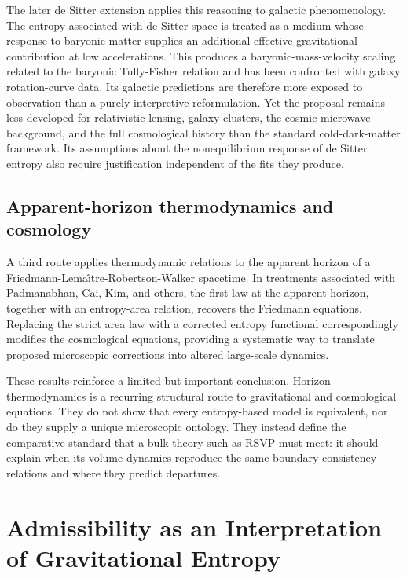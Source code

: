 \documentclass[11pt]{article}
\begin{document}
The later de Sitter extension applies this reasoning to galactic phenomenology. The entropy associated with de Sitter space is treated as a medium whose response to baryonic matter supplies an additional effective gravitational contribution at low accelerations. This produces a baryonic-mass-velocity scaling related to the baryonic Tully-Fisher relation and has been confronted with galaxy rotation-curve data. Its galactic predictions are therefore more exposed to observation than a purely interpretive reformulation. Yet the proposal remains less developed for relativistic lensing, galaxy clusters, the cosmic microwave background, and the full cosmological history than the standard cold-dark-matter framework. Its assumptions about the nonequilibrium response of de Sitter entropy also require justification independent of the fits they produce.

\subsection{Apparent-horizon thermodynamics and cosmology}
\label{subsec:friedmann}

A third route applies thermodynamic relations to the apparent horizon of a Friedmann-Lema\^{\i}tre-Robertson-Walker spacetime. In treatments associated with Padmanabhan, Cai, Kim, and others, the first law at the apparent horizon, together with an entropy-area relation, recovers the Friedmann equations. Replacing the strict area law with a corrected entropy functional correspondingly modifies the cosmological equations, providing a systematic way to translate proposed microscopic corrections into altered large-scale dynamics.

These results reinforce a limited but important conclusion. Horizon thermodynamics is a recurring structural route to gravitational and cosmological equations. They do not show that every entropy-based model is equivalent, nor do they supply a unique microscopic ontology. They instead define the comparative standard that a bulk theory such as RSVP must meet: it should explain when its volume dynamics reproduce the same boundary consistency relations and where they predict departures.

\section{Admissibility as an Interpretation of Gravitational Entropy}
\label{sec:admissibility}
\end{document}

